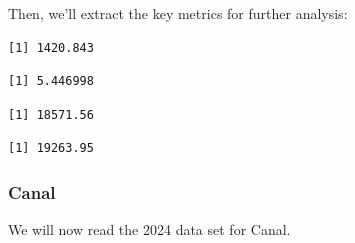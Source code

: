 Then, we'll extract the key metrics for further analysis:

\begin{Shaded}
\begin{Highlighting}[]
\SpecialCharTok{\$}
\end{Highlighting}
\end{Shaded}

\begin{verbatim}
[1] 1420.843
\end{verbatim}

\begin{Shaded}
\begin{Highlighting}[]
\SpecialCharTok{\$}
\end{Highlighting}
\end{Shaded}

\begin{verbatim}
[1] 5.446998
\end{verbatim}

\begin{Shaded}
\begin{Highlighting}[]
\SpecialCharTok{\$}
\end{Highlighting}
\end{Shaded}

\begin{verbatim}
[1] 18571.56
\end{verbatim}

\begin{Shaded}
\begin{Highlighting}[]
\SpecialCharTok{\$}
\end{Highlighting}
\end{Shaded}

\begin{verbatim}
[1] 19263.95
\end{verbatim}

\subsubsection{Canal}

We will now read the 2024 data set for Canal.

\begin{Shaded}
\begin{Highlighting}[]
\OtherTok{\textless{}{-}} 
\OtherTok{\textless{}{-}} \NormalTok{(}\NormalTok{,}\NormalTok{))}
\end{Highlighting}
\end{Shaded}

